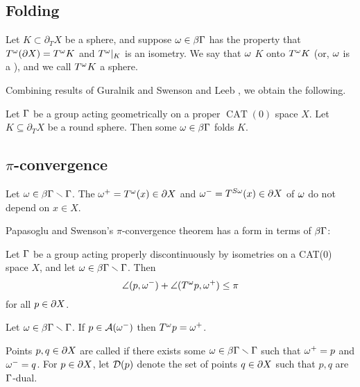 \documentclass{amsart}
\newcommand{\bdT}{\partial_T}
\DeclareMathOperator{\CAT}{CAT}
\begin{document}
\subsection{Folding}

\begin{definition}
Let $K \subset \bdT X$ be a sphere, and suppose $\omega \in \beta \Gamma$ has the property that $T^{\omega} (\partial X) = T^{\omega} K$ and $T^{\omega} \vert_{K}$ is an isometry.  We say that $\omega$  $K$ onto $T^{\omega} K$ (or, $\omega$ is a ), and we call $T^{\omega} K$ a  sphere. \end{definition}

Combining results of Guralnik and Swenson \cite[Lemma 3.25]{gs} and Leeb \cite[Proposition 2.1]{leeb}, we obtain the following.

\begin{corollary}
Let $\Gamma$ be a group acting geometrically on a proper $\CAT(0)$ space $X$.
Let $K \subseteq \bdT X$ be a round sphere.  Then some $\omega \in \beta \Gamma$ folds $K$. \end{corollary}

\subsection{$\pi$-convergence}

\begin{definition}
Let $\omega \in \beta \Gamma \smallsetminus \Gamma$.  The  $\omega^+ = T^{\omega}(x) \in \partial X$ and  $\omega^- = T^{S \omega}(x) \in \partial X$ of $\omega$ do not depend on $x \in X$. \end{definition}

Papasoglu and Swenson's $\pi$-convergence theorem \cite[Lemma 19]{ps} has a form in terms of $\beta \Gamma$:

\begin{theorem} 
Let $\Gamma$ be a group acting properly discontinuously by isometries on a \textnormal{CAT($0$)} space $X$, and let $\omega \in \beta \Gamma \smallsetminus \Gamma$.  Then
\[\angle (p, \omega^-) + \angle (T^{\omega} p, \omega^+) \le \pi\]
for all $p \in \partial X$. \end{theorem}


\begin{corollary} 		\label{antipodal pi-convergence}
Let $\omega \in \beta \Gamma \smallsetminus \Gamma$.  If $p \in \operatorname{\mathcal A}(\omega^-)$ then $T^{\omega} p = \omega^+$. \end{corollary}

\begin{definition}
Points $p,q \in \partial X$ are called  if there exists some $\omega \in \beta \Gamma \smallsetminus \Gamma$ such that $\omega^+ = p$ and $\omega^- = q$.  For $p \in \partial X$, let $\operatorname{\mathcal D}(p)$ denote the set of points $q \in \partial X$ such that $p,q$ are $\Gamma$-dual. \end{definition}
\end{document}
